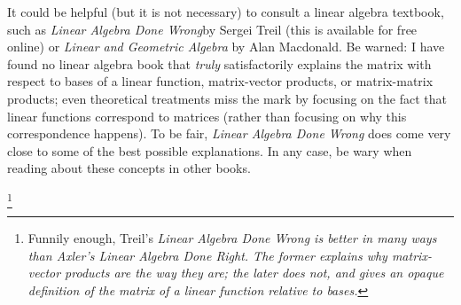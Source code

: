 It could be helpful (but it is not necessary) to consult a linear algebra textbook, such as \textit{Linear Algebra Done Wrong}\footnotemark by Sergei Treil (this is available for free online) or \textit{Linear and Geometric Algebra} by Alan Macdonald. Be warned: I have found no linear algebra book that \textit{truly} satisfactorily explains the matrix with respect to bases of a linear function, matrix-vector products, or matrix-matrix products; even theoretical treatments miss the mark by focusing on the fact that linear functions correspond to matrices (rather than focusing on why this correspondence happens). To be fair, \textit{Linear Algebra Done Wrong} does come very close to some of the best possible explanations. In any case, be wary when reading about these concepts in other books.

\footnote{Funnily enough, Treil's \textit{Linear Algebra Done Wrong is better in many ways than Axler's \textit{Linear Algebra Done Right}. The former explains why matrix-vector products are the way they are; the later does not, and gives an opaque definition of the matrix of a linear function relative to bases.}}